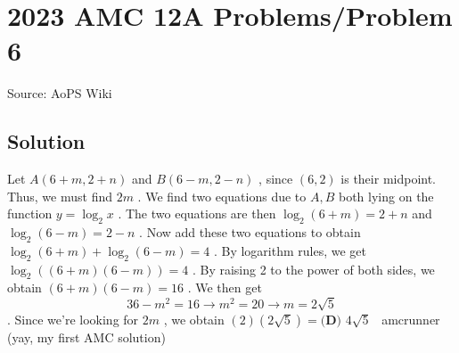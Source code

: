 \documentclass[12pt]{article}
\begin{document}
\section*{{2023 AMC 12A Problems/Problem 6}}
Source: AoPS Wiki

\subsection*{Solution}
Let $A(6+m,2+n)$ and $B(6-m,2-n)$ , since $(6,2)$ is their midpoint. Thus, we must find $2m$ . We find two equations due to $A,B$ both lying on the function $y=\log_{2}x$ . The two equations are then $\log_{2}(6+m)=2+n$ and $\log_{2}(6-m)=2-n$ . Now add these two equations to obtain $\log_{2}(6+m)+\log_{2}(6-m)=4$ . By logarithm rules, we get $\log_{2}((6+m)(6-m))=4$ . By raising 2 to the power of both sides, we obtain $(6+m)(6-m)=16$ . We then get \[36-m^2=16 \rightarrow m^2=20 \rightarrow m=2\sqrt{5}\] . Since we're looking for $2m$ , we obtain $(2)(2\sqrt{5})=\boxed{\textbf{(D) }4\sqrt{5}}$ ~amcrunner (yay, my first AMC solution)
\end{document}
